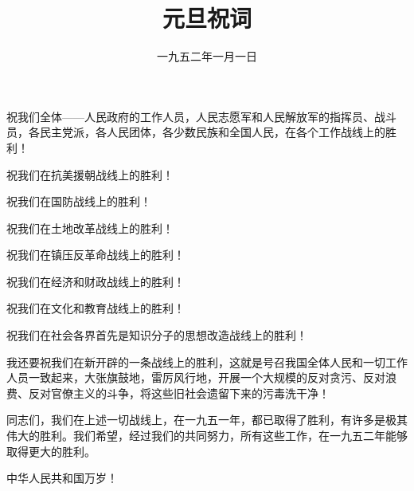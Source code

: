 
\title{元旦祝词}
\date{一九五二年一月一日}
\maketitle


祝我们全体——人民政府的工作人员，人民志愿军和人民解放军的指挥员、战斗员，各民主党派，各人民团体，各少数民族和全国人民，在各个工作战线上的胜利！

祝我们在抗美援朝战线上的胜利！

祝我们在国防战线上的胜利！

祝我们在土地改革战线上的胜利！

祝我们在镇压反革命战线上的胜利！

祝我们在经济和财政战线上的胜利！

祝我们在文化和教育战线上的胜利！

祝我们在社会各界首先是知识分子的思想改造战线上的胜利！

我还要祝我们在新开辟的一条战线上的胜利，这就是号召我国全体人民和一切工作人员一致起来，大张旗鼓地，雷厉风行地，开展一个大规模的反对贪污、反对浪费、反对官僚主义的斗争，将这些旧社会遗留下来的污毒洗干净！

同志们，我们在上述一切战线上，在一九五一年，都已取得了胜利，有许多是极其伟大的胜利。我们希望，经过我们的共同努力，所有这些工作，在一九五二年能够取得更大的胜利。

中华人民共和国万岁！
